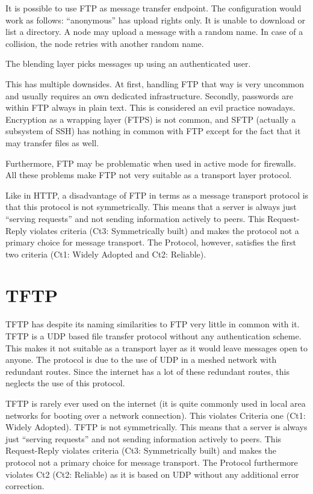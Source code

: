 \documentclass[a4paper,appendixprefix,pdfusetitle,twocolumn,fontsize=8pt,draft,DIV=calc]{scrbook}
\begin{document}
It is possible to use FTP as message transfer endpoint. The configuration would work as follows: ``anonymous'' has upload rights only. It is unable to download or list a directory. A node may upload a message with a random name. In case of a collision, the node retries with another random name.

The blending layer picks messages up using an authenticated user.

This has multiple downsides. At first, handling FTP that way is very uncommon and usually requires an own dedicated infrastructure. Secondly, passwords are within FTP always in plain text. This is considered an evil practice nowadays. Encryption as a wrapping layer (FTPS) is not common, and SFTP (actually a subsystem of SSH) has nothing in common with FTP except for the fact that it may transfer files as well.

Furthermore, FTP may be problematic when used in active mode for firewalls. All these problems make FTP not very suitable as a transport layer protocol.

Like in HTTP, a disadvantage of FTP in terms as a message transport protocol is that this protocol is not symmetrically. This means that a server is always just ``serving requests'' and not sending information actively to peers. This Request-Reply violates criteria (Ct3: Symmetrically built) and makes the protocol not a primary choice for message transport. The Protocol, however, satisfies the first two criteria  (Ct1: Widely Adopted and Ct2: Reliable).

\section{TFTP}
TFTP has despite its naming similarities to FTP very little in common with it. TFTP is a UDP based file transfer protocol without any authentication scheme. This makes it not suitable as a transport layer as it would leave messages open to anyone. The protocol is due to the use of UDP in a meshed network with redundant routes. Since the internet has a lot of these redundant routes, this neglects the use of this protocol.

TFTP is rarely ever used on the internet (it is quite commonly used in local area networks for booting over a network connection). This violates Criteria one (Ct1: Widely Adopted). TFTP is not symmetrically. This means that a server is always just ``serving requests'' and not sending information actively to peers. This Request-Reply violates criteria (Ct3: Symmetrically built) and makes the protocol not a primary choice for message transport. The Protocol furthermore violates Ct2 (Ct2: Reliable) as it is based on UDP without any additional error correction.
\end{document}
